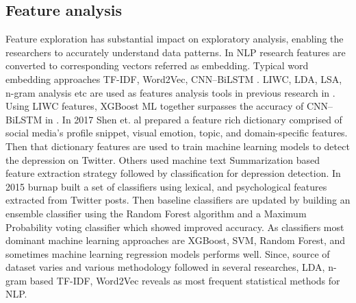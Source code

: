 \documentclass[sn-mathphys,Numbered]{sn-jnl}%
\theoremstyle{thmstyleone}%
\theoremstyle{thmstyletwo}%
\theoremstyle{thmstylethree}%
\begin{document}
\subsection{Feature analysis}
Feature exploration has substantial impact on exploratory analysis, enabling the researchers to accurately understand data patterns. In NLP research features are converted to corresponding vectors referred as embedding. Typical word embedding approaches TF-IDF, Word2Vec, CNN–BiLSTM \cite{aldhyani2022detecting, chancellor2020methods, wang2020depression, malhotra2022deep}. LIWC, LDA, LSA, n-gram analysis etc are used as features analysis tools in previous research in \cite{pennebaker2001linguistic, tadesse2019detection}. Using LIWC features, XGBoost ML together surpasses the accuracy of CNN–BiLSTM in \cite{aldhyani2022detecting}. In 2017 Shen et. al \cite{shen2017depression} prepared a feature rich dictionary comprised of social media's profile snippet, visual emotion, topic, and domain-specific features. Then that dictionary features are used to train machine learning models to detect the depression on Twitter. Others \cite{zogan2021depressionnet} used machine text Summarization based feature extraction strategy followed by classification for depression detection. In 2015 burnap \cite{burnap2015machine} built a set of classifiers using lexical, and psychological features extracted from Twitter posts. Then baseline classifiers are updated by building an ensemble classifier using the Random Forest algorithm and a Maximum Probability voting classifier which showed improved accuracy. As classifiers most dominant machine learning approaches are  XGBoost, SVM, Random Forest, and sometimes machine learning regression models performs well. Since, source of dataset varies and various methodology followed in several researches, LDA, n-gram based TF-IDF, Word2Vec reveals as most frequent statistical methods for NLP. 
\end{document}
